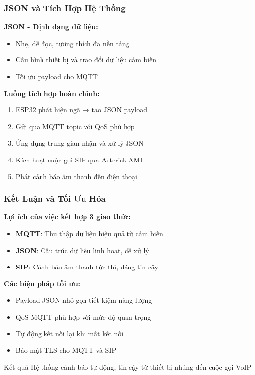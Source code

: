\begin{frame}
\frametitle{JSON và Tích Hợp Hệ Thống}

\textbf{JSON - Định dạng dữ liệu:}
\begin{itemize}
\item Nhẹ, dễ đọc, tương thích đa nền tảng
\item Cấu hình thiết bị và trao đổi dữ liệu cảm biến
\item Tối ưu payload cho MQTT
\end{itemize}

\textbf{Luồng tích hợp hoàn chỉnh:}
\begin{enumerate}
\item ESP32 phát hiện ngã → tạo JSON payload
\item Gửi qua MQTT topic với QoS phù hợp  
\item Ứng dụng trung gian nhận và xử lý JSON
\item Kích hoạt cuộc gọi SIP qua Asterisk AMI
\item Phát cảnh báo âm thanh đến điện thoại
\end{enumerate}
\end{frame}

\begin{frame}
\frametitle{Kết Luận và Tối Ưu Hóa}

\textbf{Lợi ích của việc kết hợp 3 giao thức:}
\begin{itemize}
\item \textbf{MQTT}: Thu thập dữ liệu hiệu quả từ cảm biến
\item \textbf{JSON}: Cấu trúc dữ liệu linh hoạt, dễ xử lý
\item \textbf{SIP}: Cảnh báo âm thanh tức thì, đáng tin cậy
\end{itemize}

\textbf{Các biện pháp tối ưu:}
\begin{itemize}
\item Payload JSON nhỏ gọn tiết kiệm năng lượng
\item QoS MQTT phù hợp với mức độ quan trọng
\item Tự động kết nối lại khi mất kết nối
\item Bảo mật TLS cho MQTT và SIP
\end{itemize}

\begin{block}{Kết quả}
Hệ thống cảnh báo tự động, tin cậy từ thiết bị nhúng đến cuộc gọi VoIP
\end{block}
\end{frame}

